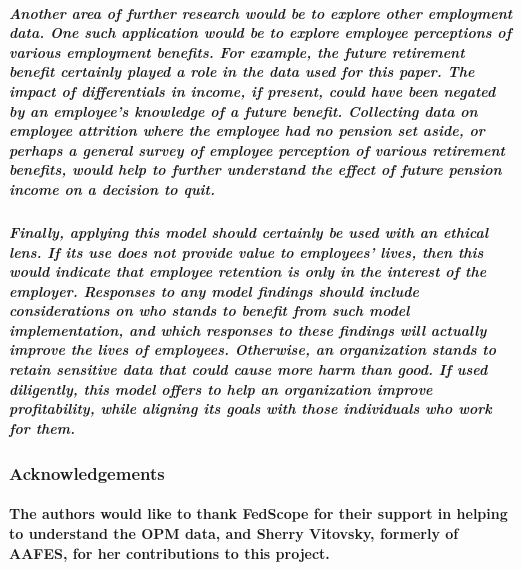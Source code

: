 \documentclass[10pt]{article}
\begin{document}
\subparagraph{Another area of further research would be to explore other employment data. One such application would be to explore employee perceptions of various employment benefits.  For example, the future retirement benefit certainly played a role in the data used for this paper.  The impact of differentials in income, if present, could have been negated by an employee's knowledge of a future benefit.  Collecting data on employee attrition where the employee had no pension set aside, or perhaps a general survey of employee perception of various retirement benefits, would help to further understand the effect of future pension income on a decision to quit.}

\subparagraph{Finally, applying this model should certainly be used with an ethical lens. If its use does not provide value to employees’  lives, then this would indicate that employee retention is only in the interest of the employer. Responses to any model findings should include considerations on who stands to benefit from such model implementation, and which responses to these findings will actually improve the lives of employees. Otherwise, an organization stands to retain sensitive data that could cause more harm than good. If used diligently, this model offers to help an organization improve profitability, while aligning its goals with those individuals who work for them.}  

\subsubsection*{Acknowledgements}

\paragraph{The authors would like to thank FedScope for their support in helping to understand the OPM data, and Sherry Vitovsky, formerly of AAFES, for her contributions to this project.}

 
\nocite{*}
\printbibliography
\end{document}
